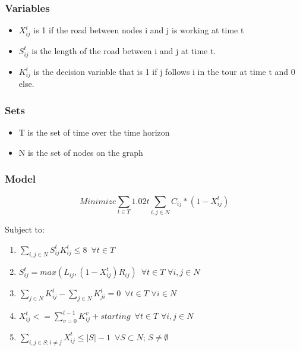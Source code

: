 \documentclass{article}
\begin{document}
	\subsubsection{Variables}
	\begin{itemize}
		\item $X_{ij}^t$ is 1 if the road between nodes i and j is working at time t
		\item $S_{ij}^t$ is the length of the road between i and j at time t. 
		\item $K_{ij}^t$ is the decision variable that is 1 if j follows i in the tour at time t and 0 else.
		
	\end{itemize}
	\subsubsection{Sets}
	\begin{itemize}
		\item T is the set of time over the time horizon
		\item N is the set of nodes on the graph
	\end{itemize}
	\subsubsection{Model}
	$$	Minimize \sum_{t \in T} 1.02t \sum_{i,j \in N} C_{ij}*(1-X_{ij}^t) $$
	
	Subject to:
	\begin{enumerate}[label=(\arabic*), leftmargin=*, itemsep=0.4ex, before={\everymath{\displaystyle}}]%
		\item $\sum_{i,j \in N} S_{ij}^t K_{ij}^t \leq 8 \hspace{6pt} \forall t\in T$
		\item $S_{ij}^t = max(L_{ij},(1-X_{ij}^t)R_{ij}) \hspace{6pt} \forall t\in T \hspace{4pt} \forall i,j \in N$
		\item $\sum_{j \in N} K_{ij}^t - \sum_{j \in N} K_{ji}^t = 0 \hspace{6pt} \forall t\in T \hspace{4pt} \forall i \in N$
		\item $X_{ij}^t <= \sum_{v=0}^{t-1} K_{ij}^v + starting \hspace{6pt} \forall t\in T \hspace{4pt} \forall i,j \in N$
		\item $\sum_{i,j \in S; i\neq j} X_{ij}^t \leq |S|-1 \hspace{6pt} \forall S \subset N; \hspace{2pt} S \neq \emptyset$
	\end{enumerate}
\end{document}
